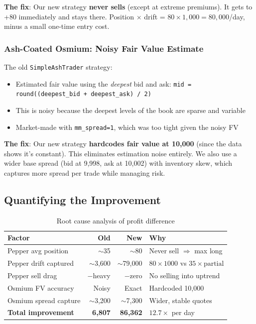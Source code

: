 \documentclass[11pt,a4paper]{article}
\begin{document}
\textbf{The fix}: Our new strategy \textbf{never sells} (except at extreme premiums). It gets to +80 immediately and stays there. Position $\times$ drift = $80 \times 1{,}000 = 80{,}000$/day, minus a small one-time entry cost.

\subsubsection{Ash-Coated Osmium: Noisy Fair Value Estimate}

The old \texttt{SimpleAshTrader} strategy:
\begin{itemize}
    \item Estimated fair value using the \textit{deepest} bid and ask: \texttt{mid = round((deepest\_bid + deepest\_ask) / 2)}
    \item This is noisy because the deepest levels of the book are sparse and variable
    \item Market-made with \texttt{mm\_spread=1}, which was too tight given the noisy FV
\end{itemize}

\textbf{The fix}: Our new strategy \textbf{hardcodes fair value at 10,000} (since the data shows it's constant). This eliminates estimation noise entirely. We also use a wider base spread (bid at 9,998, ask at 10,002) with inventory skew, which captures more spread per trade while managing risk.

\subsection{Quantifying the Improvement}

\begin{table}[H]
\centering
\caption{Root cause analysis of profit difference}
\begin{tabular}{@{}lrrl@{}}
\toprule
\textbf{Factor} & \textbf{Old} & \textbf{New} & \textbf{Why} \\
\midrule
Pepper avg position & $\sim$35 & $\sim$80 & Never sell $\Rightarrow$ max long \\
Pepper drift captured & $\sim$3{,}600 & $\sim$79{,}000 & $80 \times 1000$ vs $35 \times \text{partial}$ \\
Pepper sell drag & $-$heavy & $-$zero & No selling into uptrend \\
Osmium FV accuracy & Noisy & Exact & Hardcoded 10,000 \\
Osmium spread capture & $\sim$3{,}200 & $\sim$7{,}300 & Wider, stable quotes \\
\midrule
\textbf{Total improvement} & \textbf{6,807} & \textbf{86,362} & $\mathbf{12.7\times}$ per day \\
\bottomrule
\end{tabular}
\end{table}
\end{document}
